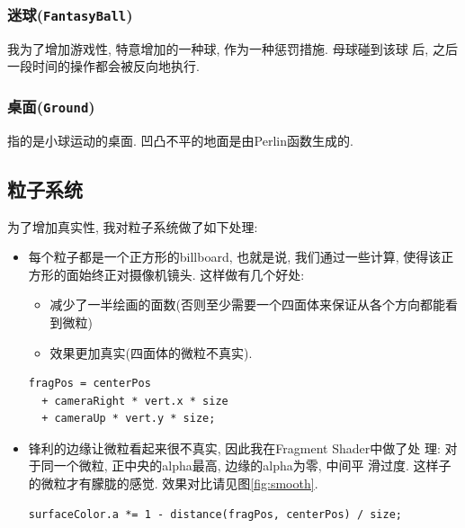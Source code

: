 \documentclass[11pt]{article}
\begin{document}
\subsubsection{迷球(\texttt{FantasyBall})}
\label{sec-3-1-8}
我为了增加游戏性, 特意增加的一种球, 作为一种惩罚措施. 母球碰到该球
后, 之后一段时间的操作都会被反向地执行.
\subsubsection{桌面(\texttt{Ground})}
\label{sec-3-1-9}
指的是小球运动的桌面. 凹凸不平的地面是由Perlin函数生成的.
\subsection{粒子系统}
\label{sec-3-2}
\label{sec:particle}
为了增加真实性, 我对粒子系统做了如下处理:
\begin{itemize}
\item 每个粒子都是一个正方形的billboard, 也就是说, 我们通过一些计算,
使得该正方形的面始终正对摄像机镜头. 这样做有几个好处: 
\begin{itemize}
\item 减少了一半绘画的面数(否则至少需要一个四面体来保证从各个方向都能看到微粒)
\item 效果更加真实(四面体的微粒不真实).
\end{itemize}
\begin{verbatim}
fragPos = centerPos
  + cameraRight * vert.x * size
  + cameraUp * vert.y * size;
\end{verbatim}
\item 锋利的边缘让微粒看起来很不真实, 因此我在Fragment Shader中做了处
理: 对于同一个微粒, 正中央的alpha最高, 边缘的alpha为零, 中间平
滑过度. 这样子的微粒才有朦胧的感觉. 效果对比请见图\ref{fig:smooth}.
\begin{verbatim}
surfaceColor.a *= 1 - distance(fragPos, centerPos) / size;
\end{verbatim}

\begin{figure}[h]
\centering


\end{figure}
\end{itemize}
\end{document}
